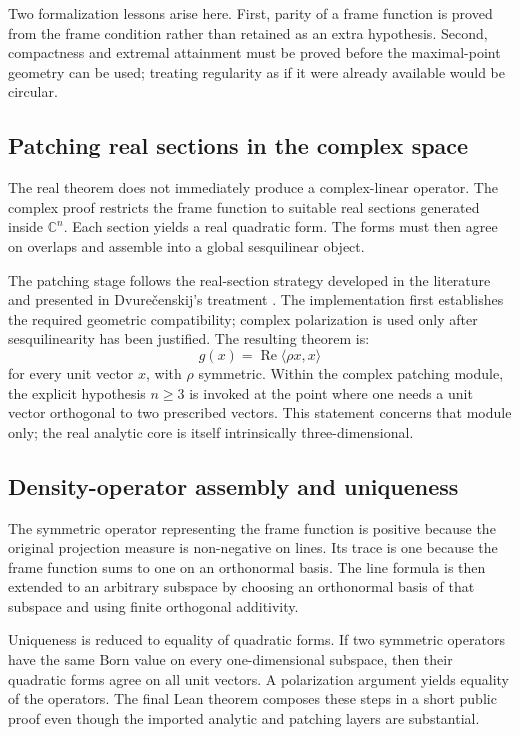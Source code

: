 \documentclass[pdflatex,sn-mathphys-num]{sn-jnl}
\theoremstyle{thmstyleone}
\theoremstyle{thmstylethree}
\begin{document}
Two formalization lessons arise here. First, parity of a frame function is proved from the frame condition rather than retained as an extra hypothesis. Second, compactness and extremal attainment must be proved before the maximal-point geometry can be used; treating regularity as if it were already available would be circular.

\subsection{Patching real sections in the complex space}\label{patching-real-sections-in-the-complex-space}

The real theorem does not immediately produce a complex-linear operator. The complex proof restricts the frame function to suitable real sections generated inside \(\mathbb C^n\). Each section yields a real quadratic form. The forms must then agree on overlaps and assemble into a global sesquilinear object.

The patching stage follows the real-section strategy developed in the literature and presented in Dvure\v{c}enskij's treatment \cite{dvurecenskij1993}. The implementation first establishes the required geometric compatibility; complex polarization is used only after sesquilinearity has been justified. The resulting theorem is: \[g(x)=\operatorname{Re}\langle \rho x,x\rangle\] for every unit vector \(x\), with \(\rho\) symmetric. Within the complex patching module, the explicit hypothesis \(n\geq3\) is invoked at the point where one needs a unit vector orthogonal to two prescribed vectors. This statement concerns that module only; the real analytic core is itself intrinsically three-dimensional.

\subsection{Density-operator assembly and uniqueness}\label{density-operator-assembly-and-uniqueness}

The symmetric operator representing the frame function is positive because the original projection measure is non-negative on lines. Its trace is one because the frame function sums to one on an orthonormal basis. The line formula is then extended to an arbitrary subspace by choosing an orthonormal basis of that subspace and using finite orthogonal additivity.

Uniqueness is reduced to equality of quadratic forms. If two symmetric operators have the same Born value on every one-dimensional subspace, then their quadratic forms agree on all unit vectors. A polarization argument yields equality of the operators. The final Lean theorem composes these steps in a short public proof even though the imported analytic and patching layers are substantial.
\end{document}
